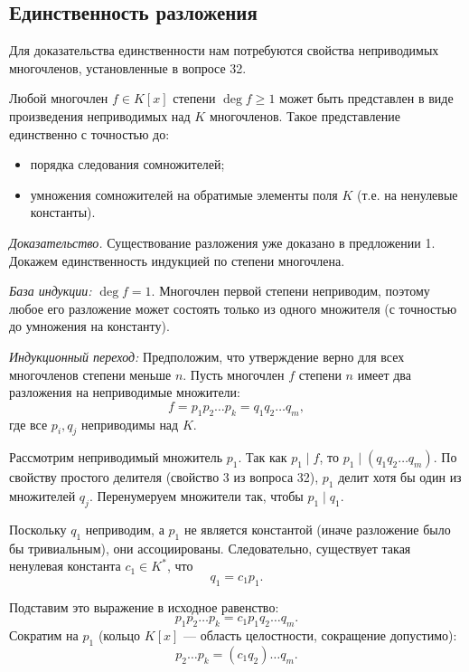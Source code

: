 \documentclass[a4paper,12pt]{article}
\theoremstyle{definition}
\theoremstyle{plain}
\theoremstyle{remark}
\begin{document}
	\subsection{Единственность разложения}
	
	Для доказательства единственности нам потребуются свойства неприводимых многочленов, установленные в вопросе 32.
		
	\begin{tcolorbox}[colback=green!5, colframe=green!50!black, title={Теорема (Факториальность $K[x]$)}]
		Любой многочлен $f \in K[x]$ степени $\deg f \geq 1$ может быть представлен в виде произведения неприводимых над $K$ многочленов. Такое представление единственно с точностью до:
		\begin{itemize}
			\item порядка следования сомножителей;
			\item умножения сомножителей на обратимые элементы поля $K$ (т.е. на ненулевые константы).
		\end{itemize}
	\end{tcolorbox}
	
	\medskip
	\textit{Доказательство.}
	Существование разложения уже доказано в предложении 1. Докажем единственность индукцией по степени многочлена.
	
	\textit{База индукции:} \( \deg f = 1 \). Многочлен первой степени неприводим, поэтому любое его разложение может состоять только из одного множителя (с точностью до умножения на константу).
	
	\textit{Индукционный переход:} Предположим, что утверждение верно для всех многочленов степени меньше \( n \). Пусть многочлен \( f \) степени \( n \) имеет два разложения на неприводимые множители:
	\[
	f = p_1 p_2 \dots p_k = q_1 q_2 \dots q_m,
	\]
	где все \( p_i, q_j \) неприводимы над \( K \).
	
	Рассмотрим неприводимый множитель \( p_1 \). Так как \( p_1 \mid f \), то \( p_1 \mid (q_1 q_2 \dots q_m) \). По свойству простого делителя (свойство 3 из вопроса 32), \( p_1 \) делит хотя бы один из множителей \( q_j \). Перенумеруем множители так, чтобы \( p_1 \mid q_1 \).
	
	Поскольку \( q_1 \) неприводим, а \( p_1 \) не является константой (иначе разложение было бы тривиальным), они ассоциированы. Следовательно, существует такая ненулевая константа \( c_1 \in K^* \), что
	\[
	q_1 = c_1 p_1.
	\]
	
	Подставим это выражение в исходное равенство:
	\[
	p_1 p_2 \dots p_k = c_1 p_1 q_2 \dots q_m.
	\]
	Сократим на \( p_1 \) (кольцо \( K[x] \) — область целостности, сокращение допустимо):
	\[
	p_2 \dots p_k = (c_1 q_2) \dots q_m.
	\]
	
\end{document}
